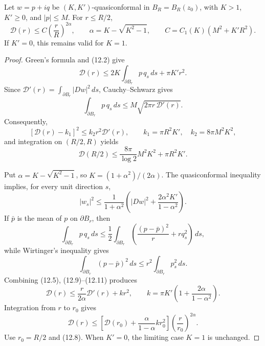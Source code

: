 \begin{lemma}
\label{gt-ch12-lem-dirichlet-integral-growth}
Let $w=p+iq$ be $(K,K')$-quasiconformal in
$B_R=B_R(z_0)$, with $K>1$, $K'\ge0$, and $|p|\le M$.  For
$r\le R/2$,
\begin{equation}\tag{12.4}
\mathcal D(r)\le C\left(\frac rR\right)^{2\alpha},
\qquad
\alpha=K-\sqrt{K^2-1},
\qquad
C=C_1(K)(M^2+K'R^2).
\end{equation}
If $K'=0$, this remains valid for $K=1$.
\end{lemma}
\begin{proof}
\sketch Green's formula and (12.2) give
\begin{equation}\tag{12.5}
\mathcal D(r)\le
2K\int_{\partial B_r}p\,q_s\,ds+\pi K'r^2.
\end{equation}
Since $\mathcal D'(r)=\int_{\partial B_r}|Dw|^2\,ds$, Cauchy--Schwarz gives
\begin{equation}\tag{12.6}
\int_{\partial B_r}p\,q_s\,ds
\le M\sqrt{2\pi r\,\mathcal D'(r)}.
\end{equation}
Consequently,
\begin{equation}\tag{12.7}
[\mathcal D(r)-k_1]^2\le k_2r^2\mathcal D'(r),
\qquad
k_1=\pi R^2K',
\quad k_2=8\pi M^2K^2,
\end{equation}
and integration on $(R/2,R)$ yields
\begin{equation}\tag{12.8}
\mathcal D(R/2)\le\frac{8\pi}{\log2}M^2K^2+\pi R^2K'.
\end{equation}

Put $\alpha=K-\sqrt{K^2-1}$, so
$K=(1+\alpha^2)/(2\alpha)$.  The quasiconformal inequality implies, for
every unit direction $s$,
\begin{equation}\tag{12.9}
|w_s|^2\le\frac1{1+\alpha^2}
\left(|Dw|^2+\frac{2\alpha^2K'}{1-\alpha^2}\right).
\end{equation}
If $\bar p$ is the mean of $p$ on $\partial B_r$, then
\begin{equation}\tag{12.10}
\int_{\partial B_r}p\,q_s\,ds
\le\frac12\int_{\partial B_r}
\left(\frac{(p-\bar p)^2}{r}+rq_s^2\right)\,ds,
\end{equation}
while Wirtinger's inequality gives
\begin{equation}\tag{12.11}
\int_{\partial B_r}(p-\bar p)^2\,ds
\le r^2\int_{\partial B_r}p_s^2\,ds.
\end{equation}
Combining (12.5), (12.9)--(12.11) produces
\begin{equation}\tag{12.12}
\mathcal D(r)\le\frac r{2\alpha}\mathcal D'(r)+kr^2,
\qquad
k=\pi K'\left(1+\frac{2\alpha}{1-\alpha^2}\right).
\end{equation}
Integration from $r$ to $r_0$ gives
\begin{equation}\tag{12.13}
\mathcal D(r)\le
\left[\mathcal D(r_0)+\frac{\alpha}{1-\alpha}kr_0^2\right]
\left(\frac r{r_0}\right)^{2\alpha}.
\end{equation}
Use $r_0=R/2$ and (12.8).  When $K'=0$, the limiting case $K=1$ is
unchanged.
\end{proof}

